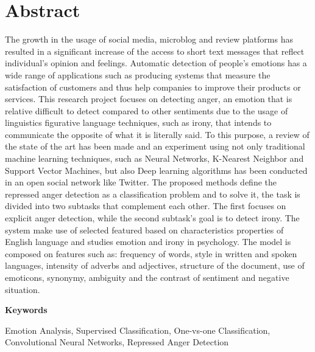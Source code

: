 \chapter*{Abstract}

The growth in the usage of social media, microblog and review platforms has resulted in a significant increase of the access to short text messages that reflect individual's opinion and feelings. Automatic detection of people's emotions has a wide range of applications such as producing systems that measure the satisfaction of customers and thus help companies to improve their products or services. This research project focuses on detecting anger, an emotion that is relative difficult to detect compared to other sentiments due to the usage of linguistics figurative language techniques, such as irony, that intends to communicate the opposite of what it is literally said.
To this purpose, a review of the state of the art has been made and an experiment using not only traditional machine learning techniques, such as Neural Networks, K-Nearest Neighbor and Support Vector Machines, but also Deep learning algorithms has been conducted in an open social network like Twitter.
The proposed methods define the repressed anger detection as a classification problem and to solve it, the task is divided into two subtasks that complement each other. The first focuses on explicit anger detection, while the second subtask's goal is to detect irony. The system make use of selected featured based on characteristics properties of English language and studies emotion and irony in psychology. The model is composed on features such as: frequency of words, style in written and spoken languages, intensity of adverbs and adjectives, structure of the document, use of emoticons, synonymy, ambiguity and the contrast of sentiment and negative situation.

\vspace{2em}

{\Large\bfseries\sffamily Keywords}
\vspace{3\medskipamount}

Emotion Analysis, Supervised Classification, One-vs-one Classification, Convolutional Neural Networks, Repressed Anger Detection
